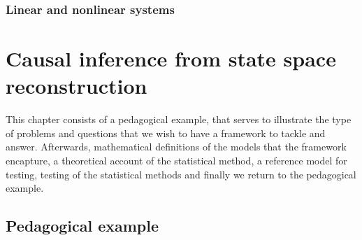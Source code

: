 \documentclass[11pt, a4paper]{memoir}
\theoremstyle{plain}
\theoremstyle{definition}
\begin{document}
\subsection{Linear and nonlinear systems}


\chapter{Causal inference from state space reconstruction}
This chapter consists of a pedagogical example, that serves to illustrate the type of problems and questions that we wish to have a framework to tackle and answer. Afterwards, mathematical definitions of the models that the framework encapture, a theoretical account of the statistical method, a reference model for testing, testing of the statistical methods and finally we return to the pedagogical example.
\section{Pedagogical example}
\end{document}
